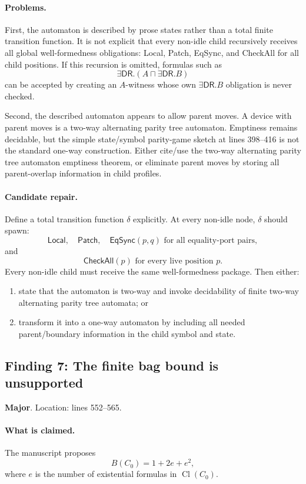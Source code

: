 \documentclass[11pt]{article}
\newcommand{\DR}{\mathsf{DR}}
\newcommand{\Cl}{\operatorname{Cl}}
\newcommand{\Major}{\textbf{\textcolor{maj}{Major}}}
\begin{document}
\paragraph{Problems.}
First, the automaton is described by prose states rather than a total finite transition function.  It is not explicit that every non-idle child recursively receives all global well-formedness obligations: \textsf{Local}, \textsf{Patch}, \textsf{EqSync}, and \textsf{CheckAll} for all child positions.  If this recursion is omitted, formulas such as
\[
  \exists\DR.(A\sqcap\exists\DR.B)
\]
can be accepted by creating an $A$-witness whose own $\exists\DR.B$ obligation is never checked.

Second, the described automaton appears to allow parent moves.  A device with parent moves is a two-way alternating parity tree automaton.  Emptiness remains decidable, but the simple state/symbol parity-game sketch at lines 398--416 is not the standard one-way construction.  Either cite/use the two-way alternating parity tree automaton emptiness theorem, or eliminate parent moves by storing all parent-overlap information in child profiles.

\paragraph{Candidate repair.}
Define a total transition function $\delta$ explicitly.  At every non-idle node, $\delta$ should spawn:
\[
  \mathsf{Local},\quad
  \mathsf{Patch},\quad
  \mathsf{EqSync}(p,q) \text{ for all equality-port pairs},
\]
and
\[
  \mathsf{CheckAll}(p) \text{ for every live position }p.
\]
Every non-idle child must receive the same well-formedness package.  Then either:
\begin{enumerate}[label=(\alph*)]
\item state that the automaton is two-way and invoke decidability of finite two-way alternating parity tree automata; or
\item transform it into a one-way automaton by including all needed parent/boundary information in the child symbol and state.
\end{enumerate}

\subsection{Finding 7: The finite bag bound is unsupported}

\noindent\Major.  Location: lines 552--565.

\paragraph{What is claimed.}
The manuscript proposes
\[
  B(C_0)=1+2e+e^2,
\]
where $e$ is the number of existential formulas in $\Cl(C_0)$.
\end{document}

